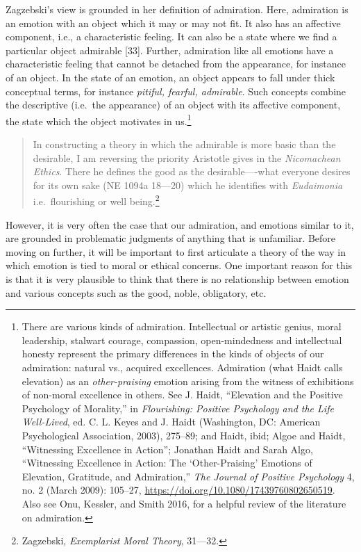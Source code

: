 \documentclass[phdthesis,12pt,final,a4paper]{wuthesis}
\theoremstyle{definition}
\theoremstyle{definition}
\theoremstyle{definition}
\theoremstyle{definition}
\theoremstyle{remark}
\begin{document}
Zagzebski's view is grounded in her definition of admiration. Here, admiration is an emotion with an object which it may or may not fit. It also has an affective component, i.e., a characteristic feeling. It can also be a state where we find a particular object admirable {[}33{]}. Further, admiration like all emotions have a characteristic feeling that cannot be detached from the appearance, for instance of an object. In the state of an emotion, an object appears to fall under thick conceptual terms, for instance \emph{pitiful, fearful, admirable}. Such concepts combine the descriptive (i.e.~the appearance) of an object with its affective component, the state which the object motivates in us.\footnote{There are various kinds of admiration. Intellectual or artistic genius, moral leadership, stalwart courage, compassion, open-mindedness and intellectual honesty represent the primary differences in the kinds of objects of our admiration: natural vs., acquired excellences. Admiration (what Haidt calls elevation) as an \emph{other-praising} emotion arising from the witness of exhibitions of non-moral excellence in others. See J. Haidt, {``Elevation and the Positive Psychology of Morality,''} in \emph{Flourishing: {Positive} Psychology and the Life Well-Lived}, ed. C. L. Keyes and J. Haidt (Washington, DC: American Psychological Association, 2003), 275--89; and Haidt, ibid; Algoe and Haidt, {``Witnessing Excellence in Action''}; Jonathan Haidt and Sarah Algo, {``Witnessing {Excellence} in {Action}: {The} {`{Other-Praising}'} {Emotions} of {Elevation}, {Gratitude}, and {Admiration},''} \emph{The Journal of Positive Psychology} 4, no. 2 (March 2009): 105--27, \url{https://doi.org/10.1080/17439760802650519}. Also see Onu, Kessler, and Smith 2016, for a helpful review of the literature on admiration.}

\begin{quote}
In constructing a theory in which the admirable is more basic than the desirable, I am reversing the priority Aristotle gives in the \emph{Nicomachean Ethics}. There he defines the good as the desirable----what everyone desires for its own sake (NE 1094a 18---20) which he identifies with \emph{Eudaimonia} i.e.~flourishing or well being.\footnote{Zagzebski, \emph{Exemplarist {Moral Theory}}, 31---32.}
\end{quote}

However, it is very often the case that our admiration, and emotions similar to it, are grounded in problematic judgments of anything that is unfamiliar. Before moving on further, it will be important to first articulate a theory of the way in which emotion is tied to moral or ethical concerns. One important reason for this is that it is very plausible to think that there is no relationship between emotion and various concepts such as the good, noble, obligatory, etc.
\end{document}
